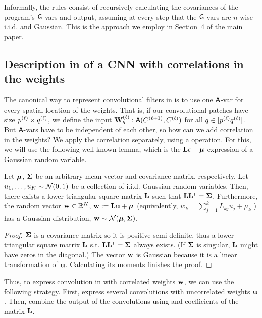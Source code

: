 { Informally, the rules consist of recursively calculating the covariances
of the
program's $\mathsf{G}$-vars and output, assuming at every step that the $\mathsf{G}$-vars are $n$-wise
i.i.d. and Gaussian. This is the approach we employ in Section~4 %
of the main paper.

\subsection{Description in \Netsor of a CNN with correlations in the weights\label{sec:netsor-program}}
The canonical way to represent
convolutional filters in \Netsor \citep[\Netsor program 4]{yang2019wide} is to
use one $\mathsf{A}$-var for every spatial location
of the weights. That is, if our convolutional patches have size $p^{(\ell)} \times q^{(\ell)}$,
we define the input $\mathbf{W}^{(\ell)}_q: \mathsf{A}(C^{(\ell+1)}, C^{(\ell)})$ for
all $q \in [p^{(\ell)}q^{(\ell)}]$. But $\mathsf{A}$-vars have to be independent
of each other, so how can we add correlation in the weights? We apply the
correlation separately, using a \LinComb operation. For this, we will use the
following well-known lemma, which is the $\mathbf{L}\epsilon + \boldsymbol{\mu}$ expression of a
Gaussian random variable.

\begin{lemma}
  Let $\boldsymbol{\mu}$, $\boldsymbol{\Sigma}$ be an arbitrary mean vector and covariance matrix, respectively.
  Let $u_1,\dots,u_K \sim \NormDist{0, 1}$ be a collection of i.i.d. Gaussian
  random variables. Then, there exists a lower-triangular square matrix 
  $\mathbf{L}$ such that $\vL\vL^\tp = \vSigma$.
  Furthermore, the random vector $\mathbf{w} \in \mathbb{R}^K$, $\mathbf{w} := \mathbf{L}\mathbf{u} + \boldsymbol{\mu}$ (equivalently, $w_k
  = \sum_{j=1}^kL_{kj}u_j + \mu_k$ ) has a Gaussian distribution, $\vw \sim \NormDist{\vmu, \vSigma}$.
  \label{lemma:L}
\end{lemma}
\begin{proof}
  $\boldsymbol{\Sigma}$ is a covariance matrix so it is positive semi-definite, thus
  a lower-triangular square matrix $\mathbf{L}$ s.t. $\vL\vL^\tp = \vSigma$ always exists. (If
  $\boldsymbol{\Sigma}$ is singular, $\mathbf{L}$
  might have zeros in the diagonal.) The vector $\mathbf{w}$ is Gaussian because it is
  a linear transformation of $\mathbf{u}$. Calculating its moments finishes the proof.
\end{proof}
Thus, to express convolution in \Netsor with correlated weights $\mathbf{w}$, we can use the
following strategy. First, express several convolutions with uncorrelated
weights $\mathbf{u}$. Then, combine the output of the convolutions using \LinComb and coefficients of
the matrix $\mathbf{L}$.

}
